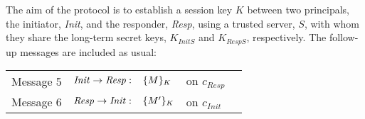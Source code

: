 \documentclass[10pt,a4paper,final,oneside,fleqn]{book}
\begin{document}
\noindent
The aim of the protocol is to establish a session key $K$ between two principals, the initiator, {\itshape Init\/}, and the responder, {\itshape Resp\/}, using a trusted server, $S$, with whom they share the long-term secret keys, $K_{InitS}$ and $K_{RespS}$, respectively.  The follow-up messages are included as usual:\vspace{5mm}

\begin{tabular}{llll}
Message 5&\hspace{3mm}$\mbox{{\itshape Init\/}}\to\mbox{{\itshape Resp\/}}:\hspace{3mm}\{M\}_{K}$&on $c_{Resp}$\\
Message 6&\hspace{3mm}$\mbox{{\itshape Resp\/}}\to\mbox{{\itshape Init\/}}:\hspace{3mm}\{M'\}_{K}$&on $c_{Init}$
\end{tabular}\vspace{5mm}
\end{document}
